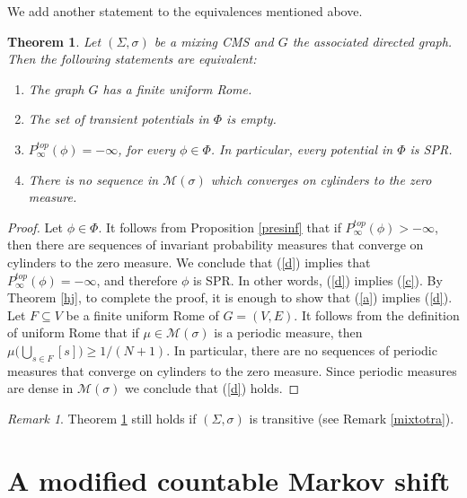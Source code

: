 \documentclass[letterpaper,11pt]{amsart}
\theoremstyle{plain}
\newtheorem{theorem}{Theorem}[section]
\theoremstyle{plain}
\theoremstyle{definition}
\theoremstyle{remark}
\newtheorem{remark}{Remark}[section]
\def\M{{\mathcal M}}
\begin{document}
We add another statement to the equivalences mentioned above.

\begin{theorem}\label{cry}  Let $(\Sigma,\sigma)$ be a mixing CMS and $G$ the associated directed graph. Then the following statements are equivalent:
\begin{enumerate}
\item\label{a} The graph $G$ has a finite uniform Rome.
\item\label{b} The set of transient potentials in $\Phi$  is empty.
\item\label{c} $P_\infty^{top}(\phi)=-\infty$, for every $\phi\in \Phi$. In particular, every potential in $\Phi$ is SPR. 
\item\label{d} There is no sequence in $\M(\sigma)$ which converges on cylinders to the zero measure. 
\end{enumerate}
\end{theorem}

\begin{proof} Let $\phi\in\Phi$. It follows from Proposition \ref{presinf} that if $P_\infty^{top}(\phi)>-\infty$, then there are sequences of invariant probability measures that converge on cylinders to the zero measure. We conclude that (\ref{d}) implies that $P_\infty^{top}(\phi)=-\infty$, and therefore $\phi$ is SPR. In other words, (\ref{d}) implies (\ref{c}). By Theorem \ref{hj}, to complete the proof,  it is enough to show that (\ref{a}) implies (\ref{d}). Let $F\subseteq V$ be a finite uniform Rome of $G=(V,E)$. It follows from the definition of uniform Rome that if $\mu\in \M(\sigma)$ is a periodic measure, then $\mu(\bigcup_{s\in F} [s]\big)\ge 1/(N+1)$. In particular, there are no sequences of periodic measures that converge on cylinders to the zero measure. Since periodic measures are dense in $\M(\sigma)$ we conclude that (\ref{d}) holds. 
\end{proof}


\begin{remark}Theorem \ref{cry} still holds if $(\Sigma,\sigma)$ is transitive (see Remark \ref{mixtotra}).
\end{remark}










\section{A modified countable Markov shift} \label{con}
\end{document}
